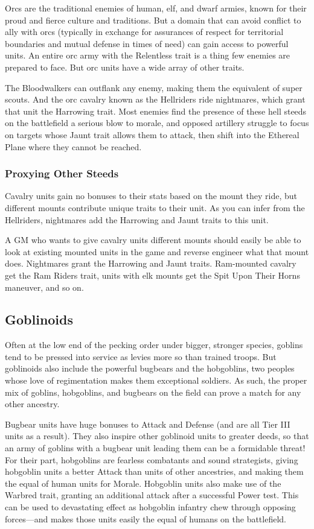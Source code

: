 \documentclass[10pt,a4paper,twoside,bg=print,twocolumn,openany,nodeprecatedcode]{dndbook}
\begin{document}
Orcs are the traditional enemies of human, elf, and dwarf armies, known for their proud and fierce culture and traditions. But a domain that can avoid conflict to ally with orcs (typically in exchange for assurances of respect for territorial boundaries and mutual defense in times of need) can gain access to powerful units. An entire orc army with the Relentless trait is a thing few enemies are prepared to face. But orc units have a wide array of other traits.

The Bloodwalkers can outflank any enemy, making them the equivalent of super scouts. And the orc cavalry known as the Hellriders ride nightmares, which grant that unit the Harrowing trait. Most enemies find the presence of these hell steeds on the battlefield a serious blow to morale, and opposed artillery struggle to focus on targets whose Jaunt trait allows them to attack, then shift into the Ethereal Plane where they cannot be reached.

\subsubsection{Proxying Other Steeds}
Cavalry units gain no bonuses to their stats based on the mount they ride, but different mounts contribute unique traits to their unit. As you can infer from the Hellriders, nightmares add the Harrowing and Jaunt traits to this unit.

A GM who wants to give cavalry units different mounts should easily be able to look at existing mounted units in the game and reverse engineer what that mount does. Nightmares grant the Harrowing and Jaunt traits. Ram-mounted cavalry get the Ram Riders trait, units with elk mounts get the Spit Upon Their Horns maneuver, and so on.

\subsection{Goblinoids}
Often at the low end of the pecking order under bigger, stronger species, goblins tend to be pressed into service as levies more so than trained troops. But goblinoids also include the powerful bugbears and the hobgoblins, two peoples whose love of regimentation makes them exceptional soldiers. As such, the proper mix of goblins, hobgoblins, and bugbears on the field can prove a match for any other ancestry.

Bugbear units have huge bonuses to Attack and Defense (and are all Tier III units as a result). They also inspire other goblinoid units to greater deeds, so that an army of goblins with a bugbear unit leading them can be a formidable threat! For their part, hobgoblins are fearless combatants and sound strategists, giving hobgoblin units a better Attack than units of other ancestries, and making them the equal of human units for Morale. Hobgoblin units also make use of the Warbred trait, granting an additional attack after a successful Power test. This can be used to devastating effect as hobgoblin infantry chew through opposing forces—and makes those units easily the equal of humans on the battlefield.
\end{document}
